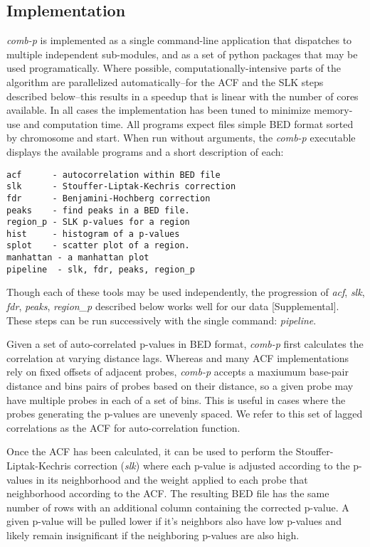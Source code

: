 \documentclass{bioinfo}
\begin{document}
\begin{methods}

\section{Implementation}

\textit{comb-p} is implemented as a single command-line application that
dispatches to multiple independent sub-modules, and as a set of python
packages that may be used programatically. Where possible,
computationally-intensive parts of the algorithm are parallelized
automatically--for the ACF and the SLK steps described below--this
results in a speedup that is linear with the number of cores available.
In all cases the implementation has been tuned to minimize memory-use and
computation time. All programs expect files simple BED format \citep{TODO-UCSC?}
sorted by chromosome and start.
When run without arguments, the \textit{comb-p} executable displays the
available programs and a short description of each:
\begin{verbatim}
acf      - autocorrelation within BED file
slk      - Stouffer-Liptak-Kechris correction
fdr      - Benjamini-Hochberg correction
peaks    - find peaks in a BED file.
region_p - SLK p-values for a region
hist     - histogram of a p-values
splot    - scatter plot of a region.
manhattan - a manhattan plot
pipeline  - slk, fdr, peaks, region_p
\end{verbatim}
Though each of these tools may be used independently, the progression of
\textit{acf}, \textit{slk}, \textit{fdr}, \textit{peaks}, \textit{region\_p}
described below works well for our data [Supplemental]. These steps can
be run successively with the single command: \textit{pipeline}.

Given a set of auto-correlated p-values in BED format, \textit{comb-p} first
calculates the correlation at varying distance lags. Whereas \citep{Kechris2010}
and many ACF implementations rely on fixed offsets of adjacent probes,
\textit{comb-p} accepts a maxiumum base-pair distance and bins pairs of probes
based on their distance, so a given probe may have multiple probes in each of
a set of bins. This is useful in cases where the probes generating the p-values
are unevenly spaced. We refer to this set of lagged correlations as the ACF for
auto-correlation function.

Once the ACF has been calculated, it can be used to perform the
Stouffer-Liptak-Kechris correction (\textit{slk}) where each p-value is
adjusted according to the p-values in its neighborhood and the weight applied
to each probe that neighborhood according to the ACF. The resulting BED file
has the same number of rows with an additional column containing the corrected
p-value. A given p-value will be pulled lower if it's neighbors also have low
p-values and likely remain insignificant if the neighboring p-values are also 
high.


\end{methods}
\end{document}
